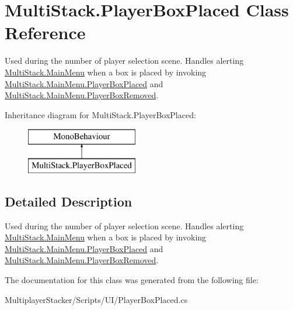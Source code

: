 \hypertarget{class_multi_stack_1_1_player_box_placed}{}\section{Multi\+Stack.\+Player\+Box\+Placed Class Reference}
\label{class_multi_stack_1_1_player_box_placed}


Used during the number of player selection scene. Handles alerting \hyperlink{class_multi_stack_1_1_main_menu}{Multi\+Stack.\+Main\+Menu} when a box is placed by invoking \hyperlink{class_multi_stack_1_1_main_menu_ae2fe990ea5367c5613591dbd23ecf9d8}{Multi\+Stack.\+Main\+Menu.\+Player\+Box\+Placed} and \hyperlink{class_multi_stack_1_1_main_menu_a1e974e00f83bacb1d410a9ea6ec73e32}{Multi\+Stack.\+Main\+Menu.\+Player\+Box\+Removed}.  


Inheritance diagram for Multi\+Stack.\+Player\+Box\+Placed\+:\begin{figure}[H]
\begin{center}
\leavevmode
\includegraphics[height=2.000000cm]{class_multi_stack_1_1_player_box_placed}
\end{center}
\end{figure}


\subsection{Detailed Description}
Used during the number of player selection scene. Handles alerting \hyperlink{class_multi_stack_1_1_main_menu}{Multi\+Stack.\+Main\+Menu} when a box is placed by invoking \hyperlink{class_multi_stack_1_1_main_menu_ae2fe990ea5367c5613591dbd23ecf9d8}{Multi\+Stack.\+Main\+Menu.\+Player\+Box\+Placed} and \hyperlink{class_multi_stack_1_1_main_menu_a1e974e00f83bacb1d410a9ea6ec73e32}{Multi\+Stack.\+Main\+Menu.\+Player\+Box\+Removed}. 



The documentation for this class was generated from the following file\+:\begin{DoxyCompactItemize}
\item 
Multiplayer\+Stacker/\+Scripts/\+U\+I/Player\+Box\+Placed.\+cs\end{DoxyCompactItemize}
